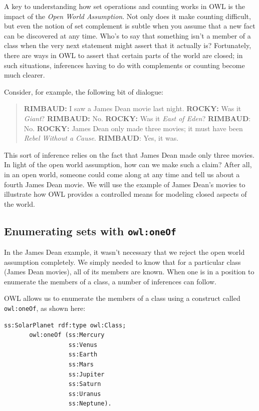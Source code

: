 A key to understanding how set operations and counting works in OWL is
the impact of the \emph{Open World Assumption}. Not only does it make counting
difficult, but even the notion of set complement is subtle when you
assume that a new fact can be discovered at any time. Who's to say that
something isn't a member of a class when the very next statement might
assert that it actually is? Fortunately, there are ways in OWL to assert
that certain parts of the world are closed; in such situations,
inferences having to do with complements or counting become much
clearer.

Consider, for example, the following bit of dialogue:

\begin{quote}
\textbf{RIMBAUD:} I saw a James Dean movie last night. 
\textbf{ROCKY:} Was it \emph{Giant}?
\textbf{RIMBAUD:} No.
\textbf{ROCKY:} Was it \emph{East of Eden}?
\textbf{RIMBAUD}: No.
\textbf{ROCKY:} James Dean only made three movies; it must have been \emph{Rebel Without a Cause}.
\textbf{RIMBAUD}: Yes, it was.
\end{quote}

This sort of inference relies on the fact that James Dean made only
three movies. In light of the open world assumption, how can we make
such a claim? After all, in an open world, someone could come along at
any time and tell us about a fourth James Dean movie. We will use the
example of James Dean's movies to illustrate how OWL provides a
controlled means for modeling closed aspects of the world.

\subsection{Enumerating sets with \texttt{owl:oneOf}}

In the James Dean example, it wasn't necessary that we reject the open
world assumption completely. We simply needed to know that for a
particular class (James Dean movies), all of its members are known. When
one is in a position to enumerate the members of a class, a number of
inferences can follow.

OWL allows us to enumerate the members of a class using a construct
called \texttt{owl:oneOf}, as shown here:

\begin{lstlisting}
ss:SolarPlanet rdf:type owl:Class; 
       owl:oneOf (ss:Mercury
                  ss:Venus
                  ss:Earth
                  ss:Mars
                  ss:Jupiter
                  ss:Saturn
                  ss:Uranus
                  ss:Neptune).
\end{lstlisting}

